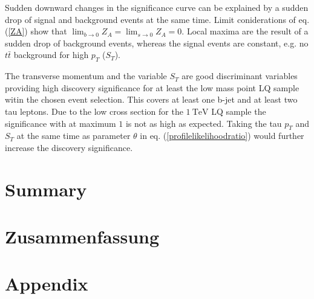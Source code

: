 %
Sudden downward changes in the significance curve can be explained by a sudden drop of signal and background events at the same time. Limit coniderations of eq. (\ref{ZA}) show that $\lim_{b\rightarrow 0}Z_A=\lim_{s\rightarrow 0}Z_A=0$. Local maxima are the result of a sudden drop of background events, whereas the signal events are constant, e.g. no $t\bar{t}$ background for high $p_T$ ($S_T$).\par
The transverse momentum and the variable $S_T$ are good discriminant variables providing high discovery significance for at least the low mass point LQ sample witin the chosen event selection. This covers at least one b-jet and at least two tau leptons. Due to the low cross section for the $\SI{1}{\tera\electronvolt}$ LQ sample the significance with at maximum $1$ is not as high as expected. Taking the tau $p_T$ and $S_T$ at the same time as parameter $\theta$ in eq. (\ref{profilelikelihoodratio}) would further increase the discovery significance.
\chapter*{Summary}      
\chapter*{Zusammenfassung}
\appendix
\chapter{Appendix}
